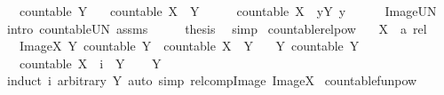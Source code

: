 \begin{isabellebody}
\ \ \ {\isachardoublequoteopen}countable\ Y{\isachardoublequoteclose}\isanewline
\ \ \ {\isachardoublequoteopen}countable\ {\isacharparenleft}X\ {\isacharbackquote}{\isacharbackquote}\ Y{\isacharparenright}{\isachardoublequoteclose}\isanewline
%
\isadelimproof
%
\endisadelimproof
%
\isatagproof
{}\isamarkupfalse%
\ {\isacharminus}\isanewline
\ \ \isamarkupfalse%
\ {\isachardoublequoteopen}countable\ {\isacharparenleft}X\ {\isacharbackquote}{\isacharbackquote}\ {\isacharparenleft}{\isasymUnion}y{\isasymin}Y{\isachardot}\ {\isacharbraceleft}y{\isacharbraceright}{\isacharparenright}{\isacharparenright}{\isachardoublequoteclose}\isanewline
\ \ \ \ \isamarkupfalse%
\ Image{\isacharunderscore}UN\ \isamarkupfalse%
\ {\isacharparenleft}intro\ countable{\isacharunderscore}UN\ assms{\isacharparenright}\isanewline
\ \ \isamarkupfalse%
\ \isamarkupfalse%
\ {\isacharquery}thesis\ \isamarkupfalse%
\ simp\isanewline
{}\isamarkupfalse%
%
\endisatagproof
{\isafoldproof}%
%
\isadelimproof
\isanewline
%
\endisadelimproof
\isanewline
{}\isamarkupfalse%
\ countable{\isacharunderscore}relpow{\isacharcolon}\isanewline
\ \ \ X\ {\isacharcolon}{\isacharcolon}\ {\isachardoublequoteopen}{\isacharprime}a\ rel{\isachardoublequoteclose}\isanewline
\ \ \ Image{\isacharunderscore}X{\isacharcolon}\ {\isachardoublequoteopen}{\isasymAnd}Y{\isachardot}\ countable\ Y\ {\isasymLongrightarrow}\ countable\ {\isacharparenleft}X\ {\isacharbackquote}{\isacharbackquote}\ Y{\isacharparenright}{\isachardoublequoteclose}\isanewline
\ \ \ Y{\isacharcolon}\ {\isachardoublequoteopen}countable\ Y{\isachardoublequoteclose}\isanewline
\ \ \ {\isachardoublequoteopen}countable\ {\isacharparenleft}{\isacharparenleft}X\ {\isacharcircum}{\isacharcircum}\ i{\isacharparenright}\ {\isacharbackquote}{\isacharbackquote}\ Y{\isacharparenright}{\isachardoublequoteclose}\isanewline
%
\isadelimproof
\ \ %
\endisadelimproof
%
\isatagproof
{}\isamarkupfalse%
\ Y\ \isamarkupfalse%
\ {\isacharparenleft}induct\ i\ arbitrary{\isacharcolon}\ Y{\isacharparenright}\ {\isacharparenleft}auto\ simp{\isacharcolon}\ relcomp{\isacharunderscore}Image\ Image{\isacharunderscore}X{\isacharparenright}%
\endisatagproof
{\isafoldproof}%
%
\isadelimproof
\isanewline
%
\endisadelimproof
\isanewline
{}\isamarkupfalse%
\ countable{\isacharunderscore}funpow{\isacharcolon}\isanewline

\end{isabellebody}
